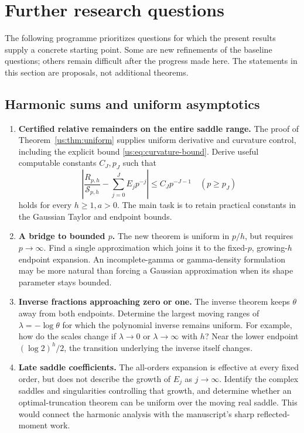\section{Further research questions}
\label{cont:sec:questions}

The following programme prioritizes questions for which the present
results supply a concrete starting point. Some are new refinements
of the baseline questions; others remain difficult after the
progress made here. The statements in this section are proposals,
not additional theorems.

\subsection{Harmonic sums and uniform asymptotics}

\begin{enumerate}[leftmargin=*,label=H\arabic*.]
\item \textbf{Certified relative remainders on the entire saddle
range.} The proof of Theorem~\ref{us:thm:uniform} supplies uniform
derivative and curvature control, including the explicit bound
\eqref{us:eq:curvature-bound}. Derive useful computable constants
$C_J,p_J$ such that
\[
 \left|\frac{R_{p,h}}{\mathcal S_{p,h}}
      -\sum_{j=0}^JE_jp^{-j}\right|
 \le C_Jp^{-J-1}\quad(p\ge p_J)
\]
holds for every $h\ge1,a>0$. The main task is to retain practical
constants in the Gaussian Taylor and endpoint bounds.

\item \textbf{A bridge to bounded $p$.} The new theorem is uniform
in $p/h$, but requires $p\to\infty$. Find a single approximation
which joins it to the fixed-$p$, growing-$h$ endpoint expansion.
An incomplete-gamma or gamma-density formulation may be more
natural than forcing a Gaussian approximation when its shape
parameter stays bounded.

\item \textbf{Inverse fractions approaching zero or one.}
The inverse theorem keeps $\theta$ away from both endpoints.
Determine the largest moving ranges of
$\lambda=-\log\theta$ for which the polynomial inverse remains
uniform. For example, how do the scales change if
$\lambda\to0$ or $\lambda\to\infty$ with $h$? Near the lower
endpoint $(\log2)^h/2$, the transition underlying the inverse
itself changes.

\item \textbf{Late saddle coefficients.} The all-orders expansion
is effective at every fixed order, but does not describe the growth
of $E_j$ as $j\to\infty$. Identify the complex saddles and
singularities controlling that growth, and determine whether an
optimal-truncation theorem can be uniform over the moving real
saddle. This would connect the harmonic analysis with the
manuscript's sharp reflected-moment work.
\end{enumerate}

